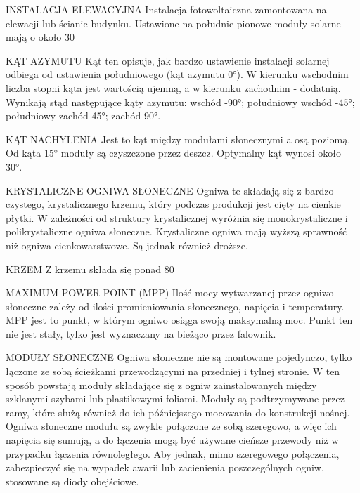 \documentclass[12pt,a4paper]{article}
\begin{document}
INSTALACJA ELEWACYJNA
Instalacja fotowoltaiczna zamontowana na elewacji lub ścianie budynku. Ustawione na południe pionowe moduły solarne mają o około 30%


KĄT AZYMUTU
Kąt ten opisuje, jak bardzo ustawienie instalacji solarnej odbiega od ustawienia południowego (kąt azymutu 0°). W kierunku wschodnim liczba stopni kąta jest wartością ujemną, a w kierunku zachodnim - dodatnią. Wynikają stąd następujące kąty azymutu: wschód -90°; południowy wschód -45°; południowy zachód 45°; zachód 90°.


KĄT NACHYLENIA
Jest to kąt między modułami słonecznymi a osą poziomą. Od kąta 15° moduły są czyszczone przez deszcz. Optymalny kąt wynosi około 30°.


KRYSTALICZNE OGNIWA SŁONECZNE
Ogniwa te składają się z bardzo czystego, krystalicznego krzemu, który podczas produkcji jest cięty na cienkie płytki. W zależności od struktury krystalicznej wyróżnia się monokrystaliczne i polikrystaliczne ogniwa słoneczne. Krystaliczne ogniwa mają wyższą sprawność niż ogniwa cienkowarstwowe. Są jednak również droższe.


KRZEM
Z krzemu składa się ponad 80%

MAXIMUM POWER POINT (MPP)
Ilość mocy wytwarzanej przez ogniwo słoneczne zależy od ilości promieniowania słonecznego, napięcia i temperatury. MPP jest to punkt, w którym ogniwo osiąga swoją maksymalną moc. Punkt ten nie jest stały, tylko jest wyznaczany na bieżąco przez falownik.

MODUŁY SŁONECZNE
Ogniwa słoneczne nie są montowane pojedynczo, tylko łączone ze sobą ścieżkami przewodzącymi na przedniej i tylnej stronie. W ten sposób powstają moduły składające się z ogniw zainstalowanych między szklanymi szybami lub plastikowymi foliami. Moduły są podtrzymywane przez ramy, które służą również do ich późniejszego mocowania do konstrukcji nośnej. Ogniwa słoneczne modułu są zwykle połączone ze sobą szeregowo, a więc ich napięcia się sumują, a do łączenia mogą być używane cieńsze przewody niż w przypadku łączenia równoległego. Aby jednak, mimo szeregowego połączenia, zabezpieczyć się na wypadek awarii lub zacienienia poszczególnych ogniw, stosowane są diody obejściowe.
\end{document}
